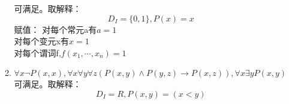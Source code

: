 \documentclass[UTF8]{ctexart}
\begin{document}
\begin{enumerate}
\begin{enumerate}
            可满足。取解释：
            \[
                D_I=\{0,1\},P(x)=x
            \]
            赋值：
            对每个常元a有$a=1$\\
            对每个变元x有$x=1$\\
            对每个谓词f,$f(x_1,\cdots ,x_n)=1$\\
            
            \item ${\forall x \neg P(x, x), \forall x\forall y\forall z(P(x, y) \wedge  P( y, z) \rightarrow  P(x, z)), \forall x\exists yP(x, y)}$
            可满足。取解释：
            \[
                D_I=R,P(x,y)=(x<y)
            \]
        \end{enumerate}

        
        
        
        
        
    \end{enumerate}
\end{document}
